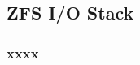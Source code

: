 \subsection{ZFS I/O Stack} %
\begin{frame}[fragile]
    \frametitle{xxxx}
\end{frame}
% 
% 
% 
% 
% 
% 
% 
% 
% 
% 
% 
% 
% 
% 
% 
